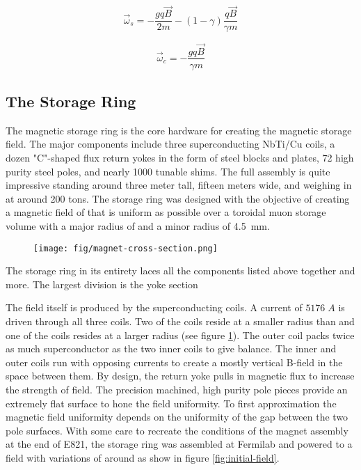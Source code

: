 \begin{equation}
\vec{\omega}_s = -\frac{gq\vec{B}}{2m} - (1 - \gamma) \frac{q\vec{B}}{\gamma m}
\label{eqn:spin-precession}
\end{equation}

\begin{equation}
\vec{\omega}_c = -\frac{gq\vec{B}}{\gamma m}
\label{eqn:cyclotron-freq}
\end{equation}

\subsection{The Storage Ring}

The magnetic storage ring is the core hardware for creating the magnetic storage field.  The major components include three superconducting NbTi/Cu coils, a dozen "C"-shaped flux return yokes in the form of steel blocks and plates, 72 high purity steel poles, and nearly 1000 tunable shims.  The full assembly is quite impressive standing around three meter tall, fifteen meters wide, and weighing in at around 200 tons.  The storage ring was designed with the objective of creating a magnetic field of \bmagic that is uniform as possible over a toroidal muon storage volume with a major radius of \rmagic and a minor radius of \SI{4.5}{\mm}.

\begin{figure}
\texttt{[image: fig/magnet-cross-section.png]}
\caption{}
\label{fig:magnet-cross-section}
\end{figure}

The storage ring in its entirety laces all the components listed above together and more.  The largest division is the yoke section

The field itself is produced by the superconducting coils.  A current of $5176\;A$ is driven through all three coils.  Two of the coils reside at a smaller radius than \rmagic and one of the coils resides at a larger radius (see figure \ref{fig:magnet-cross-section}).  The outer coil packs twice as much superconductor as the two inner coils to give balance.  The inner and outer coils run with opposing currents to create a mostly vertical B-field in the space between them.  By design, the return yoke pulls in magnetic flux to increase the strength of field.  The precision machined, high purity pole pieces provide an extremely flat surface to hone the field uniformity.  To first approximation the magnetic field uniformity depends on the uniformity of the gap between the two pole surfaces.  With some care to recreate the  conditions of the magnet assembly at the end of E821, the storage ring was assembled at Fermilab and powered to a field with variations of around  as show in figure \ref{fig:initial-field}.

